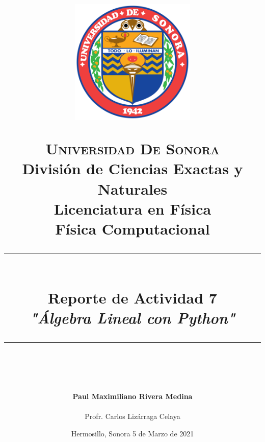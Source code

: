 \documentclass{article}
\newcommand{\HRule}[1]{\rule{\linewidth}{#1}}
\begin{document}
\begin{titlepage}

\title{ \normalsize 
        \begin{center}
        \includegraphics[height=6cm]{Logo.jpg}
        \end{center}
        \LARGE \textsc{\textbf{Universidad De Sonora}} \\ \bigskip
		\Large División de Ciencias Exactas y Naturales \\
        Licenciatura en Física \\ \bigskip
        \bigskip
       Física Computacional
		\\ [0.1cm]  
		\HRule{2pt} \\
		\Large \textbf{{Reporte de Actividad 7}} \\
        \textit{\textbf{"Álgebra Lineal con Python"}}
		\HRule{2pt} \\
		\normalsize \vspace*{0.001\baselineskip}}
        
\date{\bigskip \Large Hermosillo, Sonora  \hspace*{\fill}  5 de Marzo de 2021}

\author{
		\Large\textbf{Paul Maximiliano Rivera Medina} \\ \bigskip
        \\ \bigskip
       \Large Profr. Carlos Lizárraga Celaya}
       \end{titlepage}
       \maketitle

\newpage
\end{document}
